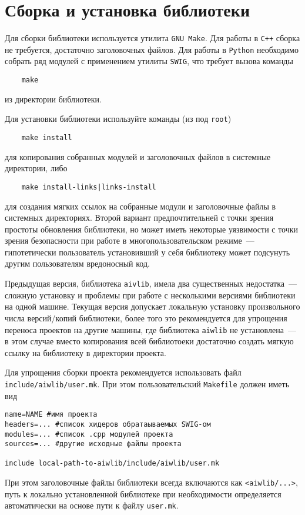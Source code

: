 \section{Сборка и установка библиотеки}
Для сборки библиотеки используется утилита \verb'GNU Make'. Для работы в \verb'C++' сборка не требуется,
достаточно заголовочных файлов. Для работы в \verb'Python' необходимо собрать
ряд модулей с применением утилиты \verb'SWIG', что требует вызова команды 
\begin{verbatim}
    make
\end{verbatim}
из директории библиотеки.

Для установки библиотеки используйте команды (из под \verb'root')
\begin{verbatim}
    make install
\end{verbatim}
для копирования собранных модулей и заголовочных файлов в системные директории, либо
\begin{verbatim}
    make install-links|links-install
\end{verbatim}
для создания мягких ссылок на собранные модули и заголовочные файлы в системных директориях.
Второй вариант предпочтительней с точки зрения простоты обновления библиотеки, 
но может иметь некоторые уязвимости с точки зрения безопасности
при работе в многопользовательском режиме~--- 
гипотетически пользователь установивший у себя библиотеку может подсунуть другим пользователям вредоносный код.

Предыдущая версия, библиотека {\tt aivlib}, имела два существенных недостатка~--- сложную установку и проблемы при
работе с несколькими версиями библиотеки на одной машине. Текущая версия допускает локальную установку
произвольного числа версий/копий библиотеки, более того это рекомендуется для  
упрощения переноса проектов на другие машины, где библиотека \verb'aiwlib' не установлена~---
в этом случае вместо копирования всей библиотоеки достаточно создать мягкую ссылку на библиотеку в директории проекта.

Для упрощения сборки проекта рекомендуется использовать файл \verb'include/aiwlib/user.mk'.
При этом пользовательский \verb'Makefile' должен иметь вид
\begin{verbatim}
name=NAME #имя проекта
headers=... #список хидеров обратаываемых SWIG-ом
modules=... #список .cpp модулей проекта
sources=... #другие исходные файлы проекта

include local-path-to-aiwlib/include/aiwlib/user.mk
\end{verbatim}
При этом заголовочные файлы библиотеки всегда включаются как \verb'<aiwlib/...>',
путь к локально установленной библиотеке при необходимости определяется автоматически на основе пути к файлу \verb'user.mk'.


